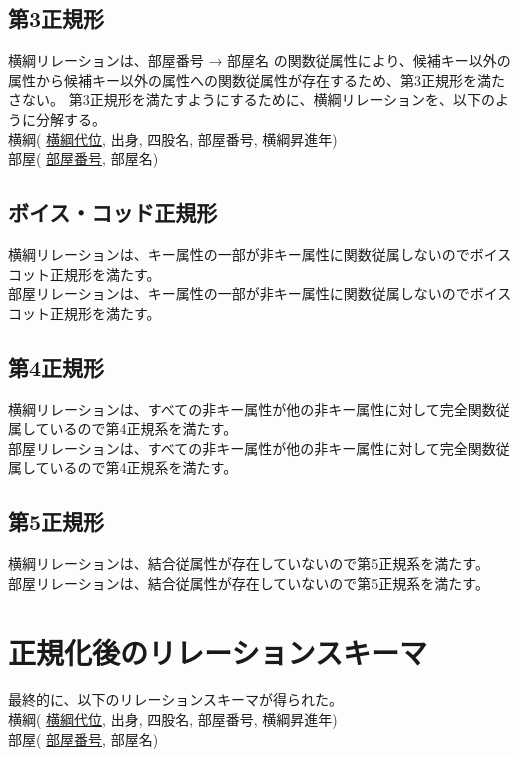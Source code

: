 \documentclass[10pt,a4paper,titlepage]{jreport}
\begin{document}
\subsection{第3正規形}
横綱リレーションは、部屋番号 → 部屋名 の関数従属性により、候補キー以外の属性から候補キー以外の属性への関数従属性が存在するため、第3正規形を満たさない。
第3正規形を満たすようにするために、横綱リレーションを、以下のように分解する。\\

横綱( \underline{横綱代位}, 出身, 四股名, 部屋番号, 横綱昇進年)\\
部屋( \underline{部屋番号}, 部屋名)\\

\subsection{ボイス・コッド正規形}
横綱リレーションは、キー属性の一部が非キー属性に関数従属しないのでボイスコット正規形を満たす。\\
部屋リレーションは、キー属性の一部が非キー属性に関数従属しないのでボイスコット正規形を満たす。\\


\subsection{第4正規形}
横綱リレーションは、すべての非キー属性が他の非キー属性に対して完全関数従属しているので第4正規系を満たす。\\
部屋リレーションは、すべての非キー属性が他の非キー属性に対して完全関数従属しているので第4正規系を満たす。\\


\subsection{第5正規形}
横綱リレーションは、結合従属性が存在していないので第5正規系を満たす。\\
部屋リレーションは、結合従属性が存在していないので第5正規系を満たす。\\

\section{正規化後のリレーションスキーマ}
最終的に、以下のリレーションスキーマが得られた。\\

横綱( \underline{横綱代位}, 出身, 四股名, 部屋番号, 横綱昇進年)\\
部屋( \underline{部屋番号}, 部屋名)\\
\end{document}
